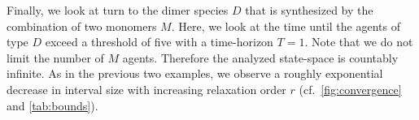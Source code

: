 
Finally, we look at turn to the dimer species $D$ that is synthesized by the combination of
two monomers $M$. Here, we look at the time until the agents of type $D$ exceed a threshold of five
with a time-horizon $T=1$. Note that we do not limit the number of $M$ agents. Therefore
the analyzed state-space is countably infinite. As in the previous two examples, we
observe a roughly exponential decrease in interval size with increasing relaxation
order $r$ (cf.\ \autoref{fig:convergence} and \autoref{tab:bounds}).


